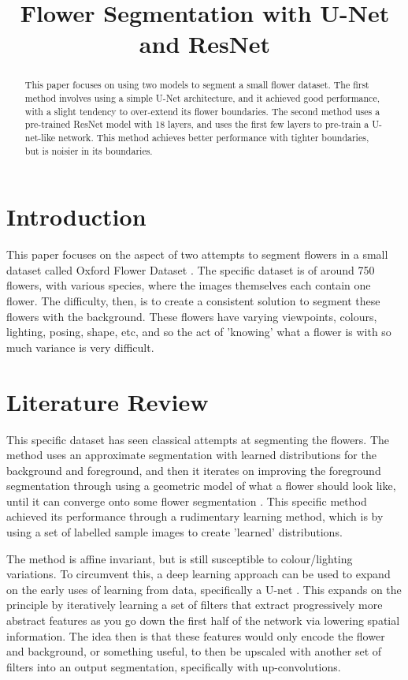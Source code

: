 \documentclass{article}
\title{Flower Segmentation with U-Net and ResNet}
\begin{document}
%
\maketitle
%
\begin{abstract}
This paper focuses on using two models to segment a small flower dataset. The first method involves using a simple U-Net architecture, and it achieved good performance, with a slight tendency to over-extend its flower boundaries. The second method uses a pre-trained ResNet model with 18 layers, and uses the first few layers to pre-train a U-net-like network. This method achieves better performance with tighter boundaries, but is noisier in its boundaries.
\end{abstract}

\section{Introduction}
\label{sec:intro}

This paper focuses on the aspect of two attempts to segment flowers in a small dataset called Oxford Flower Dataset \autocite{nilsbackVisualVocabularyFlower2006}. The specific dataset is of around 750 flowers, with various species, where the images themselves each contain one flower. The difficulty, then, is to create a consistent solution to segment these flowers with the background. These flowers have varying viewpoints, colours, lighting, posing, shape, etc, and so the act of 'knowing' what a flower is with so much variance is very difficult.
\section{Literature Review}
\label{sec:format}

This specific dataset has seen classical attempts at segmenting the flowers. The method uses an approximate segmentation with learned distributions for the background and foreground, and then it iterates on improving the foreground segmentation through using a geometric model of what a flower should look like, until it can converge onto some flower segmentation \autocite{nilsbackDelvingDeeperWhorl2010}. This specific method achieved its performance through a rudimentary learning method, which is by using a set of labelled sample images to create 'learned' distributions. 

The method is affine invariant, but is still susceptible to colour/lighting variations. To circumvent this, a deep learning approach can be used to expand on the early uses of learning from data, specifically a U-net \autocite{ronnebergerUNetConvolutionalNetworks2015}. This expands on the principle by iteratively learning a set of filters that extract progressively more abstract features as you go down the first half of the network via lowering spatial information. The idea then is that these features would only encode the flower and background, or something useful, to then be upscaled with another set of filters into an output segmentation, specifically with up-convolutions.
\end{document}
